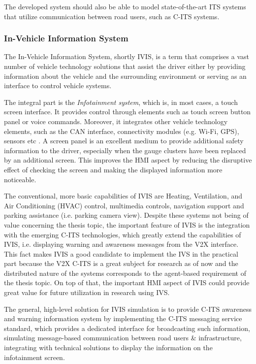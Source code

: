\documentclass[0main.tex]{subfiles}
\begin{document}
The developed system should also be able to model state-of-the-art ITS systems that utilize communication between 
road users, such as C-ITS systems. 
\subsubsection{In-Vehicle Information System}

The In-Vehicle Information System, shortly IVIS, is a term that comprises a vast number of vehicle technology 
solutions that assist the driver either by providing information about the vehicle and the surrounding environment 
or serving as an interface to control vehicle systems. 

The integral part is the \emph{Infotainment system}, which is, in most cases, a touch screen
interface. It provides control through elements such as touch screen button panel or voice
commands. Moreover, it integrates other vehicle technology elements, such as the CAN interface,
connectivity modules (e.g. Wi-Fi, GPS), sensors etc \cite{Saxena}. A screen panel is an
excellent medium to provide additional safety information to the driver, especially when the
gauge clusters have been replaced by an additional screen. This improves the HMI aspect by
reducing the disruptive effect of checking the screen and making the displayed information more
noticeable. 

The conventional, more basic capabilities of IVIS are Heating, Ventilation, and Air
Conditioning (HVAC) control, multimedia controls, navigation support and parking assistance
(i.e. parking camera view). Despite these systems not being of value concerning
the thesis topic, the important feature of IVIS is the integration with the emerging C-ITS
technologies, which greatly extend the capabilities of IVIS, i.e. displaying warning and
awareness messages from the V2X interface.  This fact makes IVIS a good candidate to implement
the IVS in the practical part because the V2X C-ITS is a great subject for research as of
now and the distributed nature of the systems corresponds to the agent-based requirement of the
thesis topic. On top of that, the important HMI aspect of IVIS could provide great value for
future utilization in research using IVS. 

The general, high-level solution for IVIS simulation is to provide C-ITS awareness and warning information system by 
implementing the C-ITS messaging service standard, which provides a dedicated interface for broadcasting such information,
simulating message-based communication between road users \& infrastructure, integrating with
technical solutions to display the information on the infotainment screen.
\end{document}
